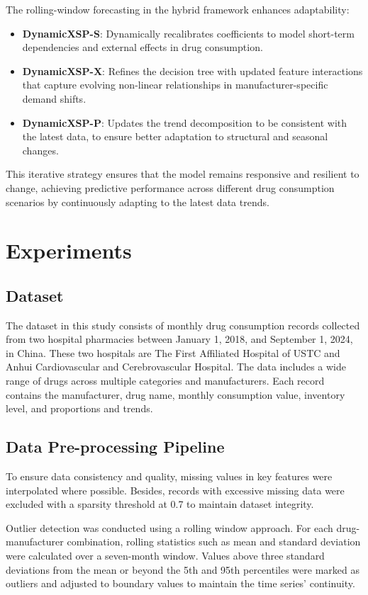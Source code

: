 \documentclass[journal]{IEEEtran}
\begin{document}
The rolling-window forecasting in the hybrid framework enhances adaptability:
\begin{itemize}
    \item \textbf{DynamicXSP-S}: Dynamically recalibrates coefficients to model short-term dependencies and external effects in drug consumption.
    \item \textbf{DynamicXSP-X}: Refines the decision tree with updated feature interactions that capture evolving non-linear relationships in manufacturer-specific demand shifts.
    \item \textbf{DynamicXSP-P}: Updates the trend decomposition to be consistent with the latest data, to ensure better adaptation to structural and seasonal changes.
\end{itemize}

This iterative strategy ensures that the model remains responsive and resilient to change, achieving predictive performance across different drug consumption scenarios by continuously adapting to the latest data trends.

\section{Experiments}

\subsection{Dataset}
The dataset in this study consists of monthly drug consumption records collected from two hospital pharmacies between January 1, 2018, and September 1, 2024, in China. These two hospitals are The First Affiliated Hospital of USTC and Anhui Cardiovascular and Cerebrovascular Hospital. The data includes a wide range of drugs across multiple categories and manufacturers. Each record contains the manufacturer, drug name, monthly consumption value, inventory level, and proportions and trends. 

\subsection{Data Pre-processing Pipeline}
To ensure data consistency and quality, missing values in key features were interpolated where possible. Besides, records with excessive missing data were excluded with a sparsity threshold at 0.7 to maintain dataset integrity.

Outlier detection was conducted using a rolling window approach. For each drug-manufacturer combination, rolling statistics such as mean and standard deviation were calculated over a seven-month window. Values above three standard deviations from the mean or beyond the 5th and 95th percentiles were marked as outliers and adjusted to boundary values to maintain the time series' continuity.
\end{document}
